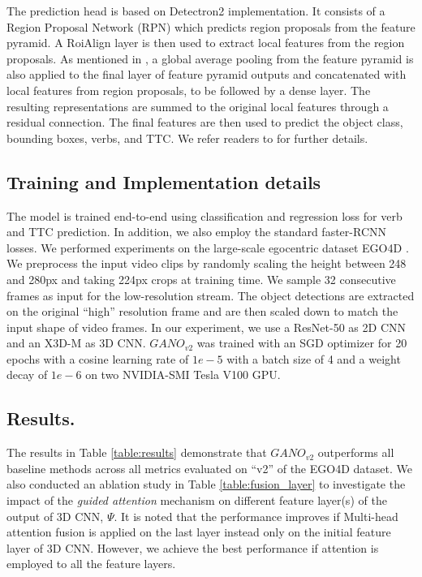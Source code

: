 \documentclass[10pt,twocolumn,letterpaper]{article}
\begin{document}
The prediction head is based on Detectron2 \cite{wu2019detectron2} implementation. It consists of a Region Proposal Network (RPN) which predicts region proposals from the feature pyramid. A RoiAlign layer is then used to extract local features from the region proposals. As mentioned in \cite{ragusa2023stillfast}, a global average pooling from the feature pyramid is also applied to the final layer of feature pyramid outputs and concatenated with local features from region proposals, to be followed by a dense layer. The resulting representations are summed to the original local features through a residual connection. The final features are then used to predict the object class, bounding boxes, verbs, and TTC.  We refer readers to \cite{ragusa2023stillfast} for further details. 

\subsection{Training and Implementation details} 
The model is trained end-to-end using classification and regression loss for verb and TTC prediction. In addition, we also employ the standard faster-RCNN losses. We performed experiments on the large-scale egocentric dataset EGO4D \cite{ego4d}. 
We preprocess the input video clips by randomly scaling the height between 248 and 280px and taking 224px crops at training time. We sample 32 consecutive frames as input for the low-resolution stream. The object detections are extracted on the original ``high'' resolution frame and are then scaled down to match the input shape of video frames. In our experiment, we use a ResNet-50 as 2D CNN and an X3D-M as 3D CNN. $GANO_{v2}$ was trained with an SGD optimizer for 20 epochs with a cosine learning rate of $1e-5$ with a batch size of 4 and a weight decay of $1e-6$ on two NVIDIA-SMI Tesla V100 GPU.

\noindent
\subsection{Results.}
 The results in Table \ref{table:results} demonstrate that $GANO_{v2}$ outperforms all baseline methods across all metrics evaluated on ``v2'' of the EGO4D dataset. We also conducted an ablation study in Table \ref{table:fusion_layer} to investigate the impact of the \emph{guided attention} mechanism on different feature layer(s) of the output of 3D CNN, $\Psi$. It is noted that the performance improves if Multi-head attention fusion is applied on the last layer instead only on the initial feature layer of 3D CNN. However, we achieve the best performance if attention is employed to all the feature layers. 
\end{document}
